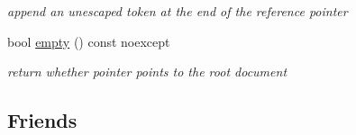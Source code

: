 \begin{DoxyCompactItemize}
\begin{DoxyCompactList}\small\item\em append an unescaped token at the end of the reference pointer \end{DoxyCompactList}\item 
bool \mbox{\hyperlink{classnlohmann_1_1json__pointer_a649252bda4a2e75a0915b11a25d8bcc3}{empty}} () const noexcept
\begin{DoxyCompactList}\small\item\em return whether pointer points to the root document \end{DoxyCompactList}\end{DoxyCompactItemize}
\subsection*{Friends}
